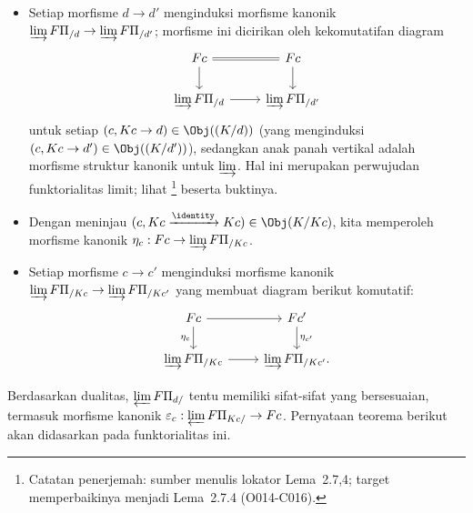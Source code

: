 \begin{itemize}
	\item Setiap morfisme $d \to d'$ menginduksi morfisme kanonik
	$\varinjlim F \Pi_{/d} \to \varinjlim F\Pi_{/d'}$; morfisme ini dicirikan
	oleh kekomutatifan diagram
	\begin{equation}\label{eqn:Kan-limit-aux-0}
	\begin{tikzcd}
		Fc \arrow[equal, r] \arrow[d] & Fc \arrow[d] \\
		\varinjlim F \Pi_{/d} \arrow[r] & \varinjlim F \Pi_{/d'}
	\end{tikzcd}\end{equation}
	untuk setiap $(c, Kc \to d) \in \Obj((K/d))$ (yang menginduksi
	$(c, Kc \to d') \in \Obj((K/d'))$), sedangkan anak panah vertikal adalah
	morfisme struktur kanonik untuk $\varinjlim$. Hal ini merupakan perwujudan funktorialitas
	limit; lihat \cite[Lema 2.7.4]{Li1}\footnote{Catatan penerjemah: sumber
	menulis lokator Lema~2.7,4; target memperbaikinya menjadi Lema~2.7.4
	(O014-C016).} beserta buktinya.
	\item Dengan meninjau
	$(c, Kc \xrightarrow{\identity} Kc) \in \Obj(K/Kc)$, kita memperoleh
	morfisme kanonik
	$\eta_c: Fc \to \varinjlim F \Pi_{/Kc}$.
	\item Setiap morfisme $c \to c'$ menginduksi morfisme kanonik
	$\varinjlim F \Pi_{/Kc} \to \varinjlim F \Pi_{/Kc'}$ yang membuat diagram
	berikut komutatif:
	\[\begin{tikzcd}
		Fc \arrow[r] \arrow[d, "{\eta_c}"'] & Fc' \arrow[d, "{\eta_{c'}}"] \\
		\varinjlim F \Pi_{/Kc} \arrow[r] & \varinjlim F \Pi_{/Kc'} .
	\end{tikzcd}\]
\end{itemize}

Berdasarkan dualitas, $\varprojlim F \Pi_{d/}$ tentu memiliki sifat-sifat yang
bersesuaian, termasuk morfisme kanonik
$\varepsilon_c: \varprojlim F\Pi_{Kc/} \to Fc$. Pernyataan teorema berikut
akan didasarkan pada funktorialitas ini.

